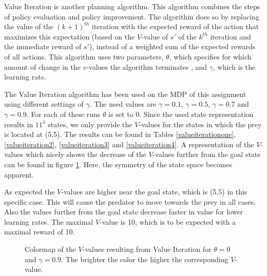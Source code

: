 \documentclass{article}
\begin{document}
Value Iteration is another planning algorithm. This algorithm combines the steps of policy evaluation and policy improvement. The algorithm does so by replacing the value of the $(k+1)^{th}$ iteration with the expected reward of the action that maximizes this expectation (based on the $V$-value of $s' $ of the $k^{th}$ iteration and the immediate reward of $s' $), instead of a weighted sum of the expected rewards of all actions. This algorithm uses two parameters, $\theta$, which specifies for which amount of change in the $v$-values the algorithm terminates , and $\gamma$, which is the learning rate.

The Value Iteration algorithm has been used on the MDP of this assignment using different settings of $\gamma$. The used values are $\gamma = 0.1$, $\gamma = 0.5$, $\gamma = 0.7$ and $\gamma = 0.9$. For each of these runs $\theta$ is set to 0. Since the used state representation results in $11^4$ states, we only provide the $V$-values for the states in which the prey is located at (5,5). The results can be found in Tables \ref{valueiterationone}, \ref{valueiteration2}, \ref{valueiteration3} and \ref{valueiteration4}. A representation of the $V$-values which nicely shows the decrease of the $V$-values further from the goal state can be found in figure \ref{colormapValueIteration}. Here, the symmetry of the state space becomes apparent.

As expected the $V$-values are higher near the goal state, which is (5,5) in this specific case. This will cause the predator to move towards the prey in all cases. Also the values further from the goal state decrease faster in value for lower learning rates. The maximal $V$-value is 10, which is to be expected with a maximal reward of 10.

\begin{figure}[htb]
        \caption{\label{colormapValueIteration} Colormap of the $V$-values  resulting from Value 
        		Iteration for $\theta=0$ and $\gamma = 0.9$. \newline
        		The brighter the color the higher the corresponding $V$-value.}
\end{figure}
\end{document}
